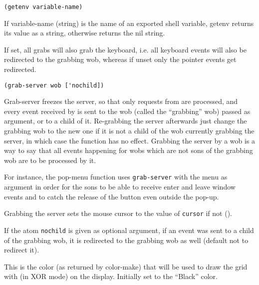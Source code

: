         
{\usagefont\begin{verbatim}
(getenv variable-name)
\end{verbatim}}\usageupspace

If variable-name (string) is the name of an exported shell variable, getenv
returns its value as a string, otherwise returns the nil string.



If set, all grabs will also grab the keyboard, i.e. all keyboard events will
also be redirected to the grabbing wob, whereas if unset only the pointer
events get redirected.

        
{\usagefont\begin{verbatim}
(grab-server wob ['nochild])
\end{verbatim}}\usageupspace

Grab-server freezes the server, so that only requests from {\GWM} are
processed, and every event received by {\GWM} is sent to the wob (called the
``grabbing'' wob) passed as argument, or to a child of it. Re-grabbing the
server afterwards just change the grabbing wob to the new one if it is not a
child of the wob currently grabbing the server, in which case the function
has no effect. Grabbing the server by a wob is a way to say that all events
happening for wobs which are not sons of the grabbing wob are to be
processed by it.

For instance, the pop-menu function uses \verb"grab-server" with the menu as
argument in order for the sons to be able to receive enter and leave window
events and to catch the release of the button even outside the pop-up.

Grabbing the server sets the mouse cursor to the value of \verb"cursor" if not
().

If the atom \verb"nochild" is given as optional argument, if an event
was sent to a child of the grabbing wob, it is redirected to the grabbing
wob as well (default not to redirect it).

        

This is the color (as returned by color-make) that will be used to draw the
grid with (in XOR mode) on the display. Initially set to the
``Black'' color.

